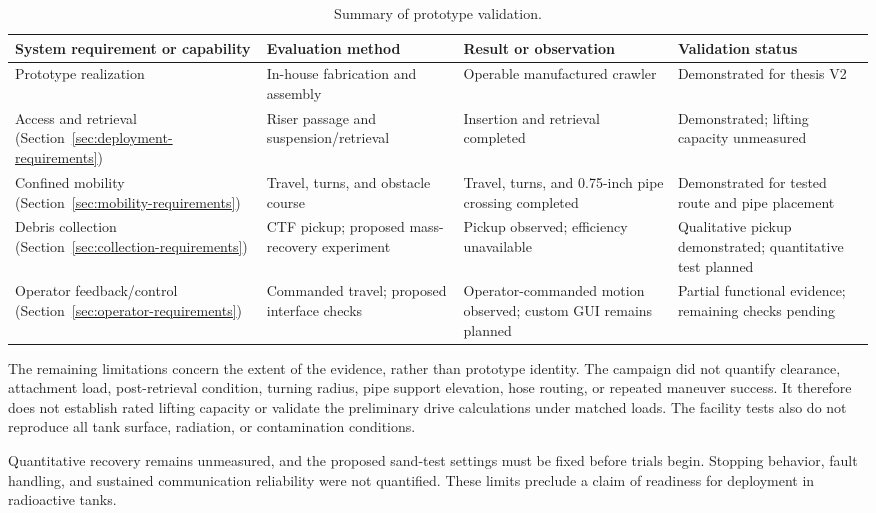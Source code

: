 \begin{table}[H]\centering
\caption{Summary of prototype validation.}
\label{tab:prototype-validation}
\begingroup\small\singlespacing\renewcommand{\arraystretch}{1.2}
\begin{tabularx}{\textwidth}{@{}XXXX@{}}\toprule
System requirement or capability & Evaluation method & Result or observation & Validation status \\\midrule
Prototype realization & In-house fabrication and assembly & Operable manufactured crawler & Demonstrated for thesis V2 \\
Access and retrieval (Section~\ref{sec:deployment-requirements}) & Riser passage and suspension/retrieval & Insertion and retrieval completed & Demonstrated; lifting capacity unmeasured \\
Confined mobility (Section~\ref{sec:mobility-requirements}) & Travel, turns, and obstacle course & Travel, turns, and 0.75-inch pipe crossing completed & Demonstrated for tested route and pipe placement \\
Debris collection (Section~\ref{sec:collection-requirements}) & CTF pickup; proposed mass-recovery experiment & Pickup observed; efficiency unavailable & Qualitative pickup demonstrated; quantitative test planned \\
Operator feedback/control (Section~\ref{sec:operator-requirements}) & Commanded travel; proposed interface checks & Operator-commanded motion observed; custom GUI remains planned & Partial functional evidence; remaining checks pending \\
\bottomrule\end{tabularx}\endgroup
\end{table}

The remaining limitations concern the extent of the evidence, rather than prototype identity. The campaign did not quantify clearance, attachment load, post-retrieval condition, turning radius, pipe support elevation, hose routing, or repeated maneuver success. It therefore does not establish rated lifting capacity or validate the preliminary drive calculations under matched loads. The facility tests also do not reproduce all tank surface, radiation, or contamination conditions.

Quantitative recovery remains unmeasured, and the proposed sand-test settings must be fixed before trials begin. Stopping behavior, fault handling, and sustained communication reliability were not quantified. These limits preclude a claim of readiness for deployment in radioactive tanks.

\par\endgroup
